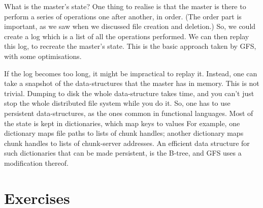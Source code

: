 What is the master's state?
One thing to realise is that the master is there to perform a series of operations
  one after another, in order.
(The order part is important, as we saw when we discussed file creation and deletion.)
So, we could create a log which is a list of all the operations performed.
We can then replay this log, to recreate the master's state.
This is the basic approach taken by GFS, with some optimisations.

If the log becomes too long, it might be impractical to replay it.
Instead,
  one can take a snapshot of the data-structures that the master has in memory.
This is not trivial.
Dumping to disk the whole data-structure takes time,
  and you can't just stop the whole distributed file system while you do it.
So, one has to use persistent data-structures,
  as the ones common in functional languages.
Most of the state is kept in dictionaries, which map keys to values
For example,
  one dictionary maps file paths to lists of chunk handles;
  another dictionary maps chunk handles to lists of chunk-server addresses.
An efficient data structure for such dictionaries that can be made persistent,
  is the B-tree,
  and GFS uses a modification thereof.


\section{Exercises}

